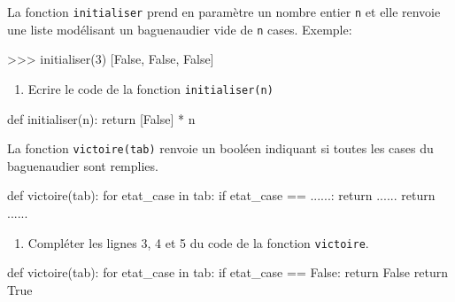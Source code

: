  La fonction \texttt{initialiser} prend en paramètre un nombre entier \texttt{n} et elle renvoie une liste modélisant un baguenaudier vide de \texttt{n} cases. Exemple:

    \begin{CodePythontexAlt}[TaillePolice=\large, Largeur=1\linewidth,Centre,Lignes=true,PremLigne=1]{}
    >>> initialiser(3)
    [False, False, False]
\end{CodePythontexAlt}

\pagebreak

\begin{enumerate}[resume]
\item Ecrire le code de la fonction \texttt{initialiser(n)}
\end{enumerate}

\begin{blocvisible}[height=3]
    \begin{CodePythontexAlt}[TaillePolice=\large, Largeur=1\linewidth,Centre,Lignes=true,PremLigne=1]{}
    def initialiser(n):
        return [False] * n
    \end{CodePythontexAlt}
\end{blocvisible}

\medskip

 La fonction \texttt{victoire(tab)} renvoie un booléen indiquant si toutes les cases du baguenaudier sont remplies.

    \begin{CodePythontexAlt}[TaillePolice=\large, Largeur=1\linewidth,Centre,Lignes=true,PremLigne=1]{}
def victoire(tab):
    for etat_case in tab:
        if etat_case == ......:
            return ......
    return ......

    \end{CodePythontexAlt}


        \begin{enumerate}[resume]
\item Compléter les lignes 3, 4 et 5 du code de la fonction \texttt{victoire}.
\end{enumerate}

\begin{blocvisible}[height=4]
    \begin{CodePythontexAlt}[TaillePolice=\large, Largeur=1\linewidth,Centre,Lignes=true,PremLigne=1]{}
    def victoire(tab):
        for etat_case in tab:
            if etat_case == False:
                return False
        return True
    \end{CodePythontexAlt}
\end{blocvisible}

